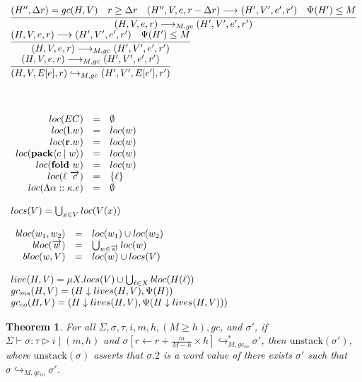 \documentclass[fleqn]{article}
\newtheorem{theorem}{Theorem}
\begin{document}
\[\begin{array}{l}
	\infer{(H,V,e,r) \longrightarrow_{M,gc} (H',V',e',r')}{(H'',\Delta r) = gc(H,V) & r \ge \Delta r & (H'',V,e,r-\Delta r) \longrightarrow (H',V',e',r') & \Psi(H') \le M} \\
	\infer{(H,V,e,r) \longrightarrow_{M,gc} (H',V',e',r')}{(H,V,e,r) \longrightarrow (H',V',e',r') & \Psi(H') \le M} \\
	\infer{(H,V,E[e],r) \hookrightarrow_{M,gc} (H',V',E[e'],r')}{(H,V,e,r) \longrightarrow_{M,gc} (H',V',e',r')} \\
	\\
	\\
	\\
	\begin{array}{rcl}
		loc(EC) & = & \emptyset \\
		loc(\mathbf{l}.w) & = & loc(w) \\
		loc(\mathbf{r}.w) & = & loc(w) \\
		loc(\mathbf{pack} \langle c \mid w \rangle) & = & loc(w) \\
		loc(\mathbf{fold}~w) & = & loc(w) \\
		loc(\ell~\overrightarrow{c}) & = & \{ \ell \} \\
		loc(\Lambda \alpha :: \kappa. e) & = & \emptyset
	\end{array} \\
	\\
	locs(V) = \bigcup_{x\in V} loc(V(x)) \\
	\\
	\begin{array}{rcl}
		bloc(w_1,w_2) & = & loc(w_1) \cup loc(w_2) \\
		bloc(\overrightarrow{w}) & = & \bigcup_{w \in \overrightarrow{w}} loc(w) \\
		bloc(w,V) & = & loc(w) \cup locs(V)
	\end{array} \\
	\\
	live(H,V) = \mu X. locs(V) \cup \bigcup_{\ell \in X} bloc(H(\ell))  \\
	gc_{ms}(H,V) = (H \downarrow lives(H,V), \Psi(H)) \\
	gc_{co}(H,V) = (H \downarrow lives(H,V), \Psi(H \downarrow lives(H,V)))
\end{array}
\]

\begin{theorem}
	For all $\Sigma,\sigma,\tau,i,m,h,(M \ge h),gc$, and $\sigma'$, if $\Sigma \vdash \sigma : \tau \triangleright i \mid (m,h)$ and $\sigma[r \leftarrow r+ \frac{m}{M-h}\times h] \hookrightarrow_{M,gc_{co}}^* \sigma'$,
	then $\mathrm{unstack}(\sigma')$, where $\mathrm{unstack}(\sigma)$ asserts that $\sigma.2$ is a word value of there exists $\sigma'$ such that $\sigma \hookrightarrow_{M,gc_{co}} \sigma'$.
\end{theorem}
\end{document}
